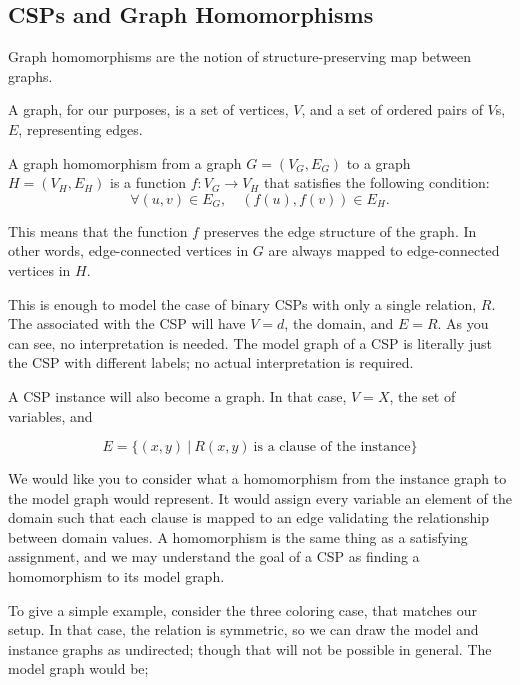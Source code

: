 \subsection{CSPs and Graph Homomorphisms}\label{sec:homomorphism}

Graph homomorphisms are the notion of structure-preserving map between graphs. 

\begin{definition}
A graph, for our purposes, is a set of vertices, $V$, and a set of ordered pairs of $V$s, $E$, representing edges.
\end{definition}

\begin{definition}
A graph homomorphism from a graph $G = (V_G, E_G)$ to a graph $H = (V_H, E_H)$ is a function $f: V_G \rightarrow V_H$ that satisfies the following condition:
\begin{equation}
    \forall (u, v) \in E_G, \quad (f(u), f(v)) \in E_H.    
\end{equation}    
\end{definition}

This means that the function $f$ preserves the edge structure of the graph. In other words, edge-connected vertices in $G$ are always mapped to edge-connected vertices in $H$.

This is enough to model the case of binary CSPs with only a single relation, $R$. The  associated with the CSP will have $V = d$, the domain, and $E = R$. As you can see, no interpretation is needed. The model graph of a CSP is literally just the CSP with different labels; no actual interpretation is required.

A CSP instance will also become a graph. In that case, $V = X$, the set of variables, and

\begin{equation}
    E = \{ (x, y)\ |\ R(x, y)\ \text{is a clause of the instance} \}
\end{equation}

We would like you to consider what a homomorphism from the instance graph to the model graph would represent. It would assign every variable an element of the domain such that each clause is mapped to an edge validating the relationship between domain values. A homomorphism is the same thing as a satisfying assignment, and we may understand the goal of a CSP as finding a homomorphism to its model graph.

To give a simple example, consider the three coloring case, that matches our setup. In that case, the relation is symmetric, so we can draw the model and instance graphs as undirected; though that will not be possible in general. The model graph would be;

